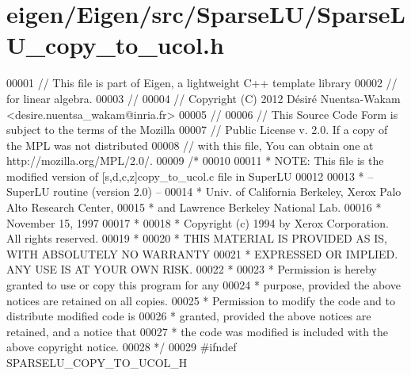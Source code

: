 \hypertarget{eigen_2_eigen_2src_2_sparse_l_u_2_sparse_l_u__copy__to__ucol_8h_source}{}\section{eigen/\+Eigen/src/\+Sparse\+L\+U/\+Sparse\+L\+U\+\_\+copy\+\_\+to\+\_\+ucol.h}
\label{eigen_2_eigen_2src_2_sparse_l_u_2_sparse_l_u__copy__to__ucol_8h_source}

\begin{DoxyCode}
00001 \textcolor{comment}{// This file is part of Eigen, a lightweight C++ template library}
00002 \textcolor{comment}{// for linear algebra.}
00003 \textcolor{comment}{//}
00004 \textcolor{comment}{// Copyright (C) 2012 Désiré Nuentsa-Wakam <desire.nuentsa\_wakam@inria.fr>}
00005 \textcolor{comment}{//}
00006 \textcolor{comment}{// This Source Code Form is subject to the terms of the Mozilla}
00007 \textcolor{comment}{// Public License v. 2.0. If a copy of the MPL was not distributed}
00008 \textcolor{comment}{// with this file, You can obtain one at http://mozilla.org/MPL/2.0/.}
00009 \textcolor{comment}{/* }
00010 \textcolor{comment}{ }
00011 \textcolor{comment}{ * NOTE: This file is the modified version of [s,d,c,z]copy\_to\_ucol.c file in SuperLU }
00012 \textcolor{comment}{ }
00013 \textcolor{comment}{ * -- SuperLU routine (version 2.0) --}
00014 \textcolor{comment}{ * Univ. of California Berkeley, Xerox Palo Alto Research Center,}
00015 \textcolor{comment}{ * and Lawrence Berkeley National Lab.}
00016 \textcolor{comment}{ * November 15, 1997}
00017 \textcolor{comment}{ *}
00018 \textcolor{comment}{ * Copyright (c) 1994 by Xerox Corporation.  All rights reserved.}
00019 \textcolor{comment}{ *}
00020 \textcolor{comment}{ * THIS MATERIAL IS PROVIDED AS IS, WITH ABSOLUTELY NO WARRANTY}
00021 \textcolor{comment}{ * EXPRESSED OR IMPLIED.  ANY USE IS AT YOUR OWN RISK.}
00022 \textcolor{comment}{ *}
00023 \textcolor{comment}{ * Permission is hereby granted to use or copy this program for any}
00024 \textcolor{comment}{ * purpose, provided the above notices are retained on all copies.}
00025 \textcolor{comment}{ * Permission to modify the code and to distribute modified code is}
00026 \textcolor{comment}{ * granted, provided the above notices are retained, and a notice that}
00027 \textcolor{comment}{ * the code was modified is included with the above copyright notice.}
00028 \textcolor{comment}{ */}
00029 \textcolor{preprocessor}{#ifndef SPARSELU\_COPY\_TO\_UCOL\_H}

\end{DoxyCode}
